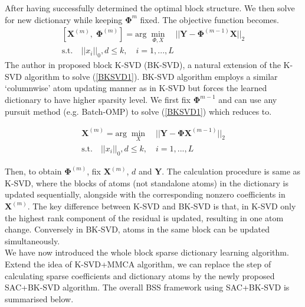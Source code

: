 After having successfully determined the optimal block structure. We then solve for new dictionary while keeping $\mathbf{\Phi}^{m}$ fixed. The objective function becomes.
\begin{equation}
\begin{aligned}
    \left[\mathbf{X}^{(m)}, \;\mathbf{\Phi}^{(m)}\right] = \text{arg} \; \min_{\Phi,X} \quad || \mathbf{Y} - \mathbf{\Phi}^{(m-1)}\mathbf{X}||_2 \\
    \text{s.t.} \quad ||x_i||_0,d \leq k, \quad i = 1,...,L
\end{aligned}
\label{BKSVD1}
\end{equation}
The author in \cite{dictionary_block_sparse} proposed block K-SVD (BK-SVD), a natural extension of the K-SVD algorithm to solve (\ref{BKSVD1}). BK-SVD algorithm employs a similar `columnwise' atom updating manner as in K-SVD but forces the learned dictionary to have higher sparsity level. We first fix $\mathbf{\Phi}^{m-1}$ and can use any pursuit method (e.g. Batch-OMP) to solve (\ref{BKSVD1}) which reduces to.

\begin{equation}
\begin{aligned}
    \mathbf{X}^{(m)} = \text{arg} \; \min_X \quad || \mathbf{Y} - \mathbf{\Phi}\mathbf{X}^{(m-1)}||_2 \\
    \text{s.t.} \quad ||x_i||_0,d \leq k, \quad i = 1,...,L
\end{aligned}
\end{equation}

Then, to obtain $\mathbf{\Phi}^{(m)}$, fix $\mathbf{X}^{(m)}$, $d$ and $\mathbf{Y}$. The calculation procedure is same as K-SVD, where the blocks of atoms (not standalone atoms) in the dictionary is updated sequentially, alongside with the corresponding nonzero coefficients in $\mathbf{X}^{(m)}$. The key difference between K-SVD and BK-SVD is that, in K-SVD only the highest rank component of the residual is updated, resulting in one atom change. Conversely in BK-SVD, atoms in the same block can be updated simultaneously.\\

We have now introduced the whole block sparse dictionary learning algorithm. Extend the idea of K-SVD+MMCA algorithm, we can replace the step of calculating sparse coefficients and dictionary atoms by the newly proposed SAC+BK-SVD algorithm. The overall BSS framework using SAC+BK-SVD is summarised below.

